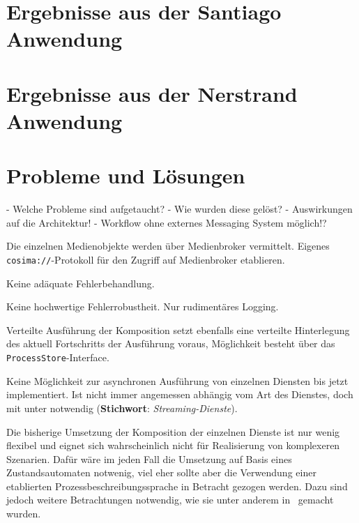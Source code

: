 
\section{Ergebnisse aus der Santiago Anwendung} %
\label{sec:ergebnisse_aus_der_santiago_anwendung}


\section{Ergebnisse aus der Nerstrand Anwendung} %
\label{sec:ergebnisse_aus_der_nerstrand_anwendung}


\section{Probleme und Lösungen} %
\label{sec:probleme_und_loesungen_architektur}

  - Welche Probleme sind aufgetaucht?
  - Wie wurden diese gelöst?
  - Auswirkungen auf die Architektur!
  - Workflow ohne externes Messaging System möglich!?
  
  Die einzelnen Medienobjekte werden über Medienbroker vermittelt. Eigenes \verb!cosima://!-Protokoll für den Zugriff auf Medienbroker etablieren.
    
  Keine adäquate Fehlerbehandlung.
  
  Keine hochwertige Fehlerrobustheit. Nur rudimentäres Logging.
  
  Verteilte Ausführung der Komposition setzt ebenfalls eine verteilte Hinterlegung des aktuell Fortschritts der Ausführung voraus, Möglichkeit besteht über das \verb!ProcessStore!-Interface.
  
  Keine Möglichkeit zur asynchronen Ausführung von einzelnen Diensten bis jetzt implementiert. Ist nicht immer angemessen abhängig vom Art des Dienstes, doch mit unter notwendig (\textbf{Stichwort}: \emph{Streaming-Dienste}).
  
  Die bisherige Umsetzung der Komposition der einzelnen Dienste ist nur wenig flexibel und eignet sich wahrscheinlich nicht für Realisierung von komplexeren Szenarien. Dafür wäre im jeden Fall die Umsetzung auf Basis eines Zustandsautomaten notwenig, viel eher sollte aber die Verwendung einer etablierten Prozessbeschreibungssprache in Betracht gezogen werden. Dazu sind jedoch weitere Betrachtungen notwendig, wie sie unter anderem in~\citep{samma08} gemacht wurden.

